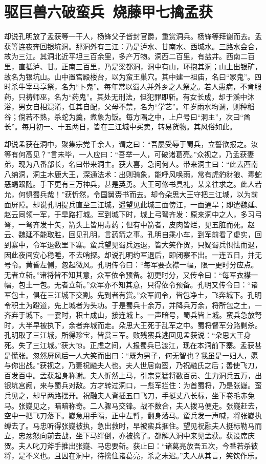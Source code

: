 \chapter{驱巨兽六破蛮兵~烧藤甲七擒孟获}

却说孔明放了孟获等一干人，杨锋父子皆封官爵，重赏洞兵。杨锋等拜谢而去。孟获等连夜奔回银坑洞。那洞外有三江：乃是泸水、甘南水、西城水。三路水会合，故为三江。其洞北近平坦三百余里，多产万物。洞西二百里，有盐井。西南二百里，直抵泸、甘。正南三百里，乃是梁都洞，洞中有山，环抱其洞；山上出银矿，故名为银坑山。山中置宫殿楼台，以为蛮王巢穴。其中建一祖庙，名曰“家鬼”。四时杀牛宰马享祭，名为“卜鬼”。每年常以蜀人并外乡之人祭之。若人患病，不肯服药，只祷师巫，名为“药鬼”。其处无刑法，但犯罪即斩。有女长成，却于溪中沐浴，男女自相混淆，任其自配，父母不禁，名为“学艺”。年岁雨水均调，则种稻谷；倘若不熟，杀蛇为羹，煮象为饭。每方隅之中，上户号曰“洞主”，次曰“酋长”。每月初一、十五两日，皆在三江城中买卖，转易货物。其风俗如此。

却说孟获在洞中，聚集宗党千余人，谓之曰：“吾屡受辱于蜀兵，立誓欲报之。汝等有何高见？”言未毕，一人应曰：“吾举一人，可破诸葛亮。”众视之，乃孟获妻弟，现为八番部长，名曰带来洞主。获大喜，急问何人。带来洞主曰：“此去西南八纳洞，洞主木鹿大王，深通法术：出则骑象，能呼风唤雨，常有虎豹豺狼、毒蛇恶蝎跟随。手下更有三万神兵，甚是英勇。大王可修书具礼，某亲往求之。此人若允，何惧蜀兵哉！”获忻然，令国舅赍书而去。却令朵思大王守把三江城，以为前面屏障。却说孔明提兵直至三江城，遥望见此城三面傍江，一面通旱；即遣魏延、赵云同领一军，于旱路打城。军到城下时，城上弓弩齐发：原来洞中之人，多习弓弩，一弩齐发十矢，箭头上皆用毒药；但有中箭者，皮肉皆烂，见五脏而死。赵云、魏延不能取胜，回见孔明，言药箭之事。孔明自乘小车，到军前看了虚实，回到寨中，令军退数里下寨。蛮兵望见蜀兵远退，皆大笑作贺，只疑蜀兵惧怯而退，因此夜间安心稳睡，不去哨探。却说孔明约军退后，即闭寨不出。一连五日，并无号令。黄昏左侧，忽起微风。孔明传令曰：“每军要衣襟一幅，限一更时分应点。无者立斩。”诸将皆不知其意，众军依令预备。初更时分，又传令曰：“每军衣襟一幅，包土一包。无者立斩。”众军亦不知其意，只得依令预备。孔明又传令曰：“诸军包土，俱在三江城下交割。先到者有赏。”众军闻令，皆包净土，飞奔城下。孔明令积土为蹬道，先上城者为头功。于是蜀兵十余万，并降兵万余，将所包之土，一齐弃于城下。一霎时，积土成山，接连城上。一声暗号，蜀兵皆上城。蛮兵急放弩时，大半早被执下，余者弃城而走。朵思大王死于乱军之中。蜀将督军分路剿杀。孔明取了三江城，所得珍宝，皆赏三军。败残蛮兵逃回见孟获说：“朵思大王身死。失了三江城。”获大惊。正虑之间，人报蜀兵已渡江，现在本洞前下寨。孟获甚是慌张。忽然屏风后一人大笑而出曰：“既为男子，何无智也？我虽是一妇人，愿与你出战。”获视之，乃妻祝融夫人也。夫人世居南蛮，乃祝融氏之后；善使飞刀，百发百中。孟获起身称谢。夫人忻然上马，引宗党猛将数百员、生力洞兵五万，出银坑宫阙，来与蜀兵对敌。方才转过洞口，一彪军拦住：为首蜀将，乃是张嶷。蛮兵见之，却早两路摆开。祝融夫人背插五口飞刀，手挺丈八长标，坐下卷毛赤兔马。张嶷见之，暗暗称奇。二人骤马交锋。战不数合，夫人拨马便走。张嶷赶去，空中一把飞刀落下。嶷急用手隔，正中左臂，翻身落马。蛮兵发一声喊，将张嶷执缚去了。马忠听得张嶷被执，急出救时，早被蛮兵捆住。望见祝融夫人挺标勒马而立，忠忿怒向前去战，坐下马绊倒，亦被擒了。都解入洞中来见孟获。获设席庆贺。夫人叱刀斧手推出张嶷、马忠要斩。获止曰：“诸葛亮放吾五次，今番若杀彼将，是不义也。且囚在洞中，待擒住诸葛亮，杀之未迟。”夫人从其言，笑饮作乐。

